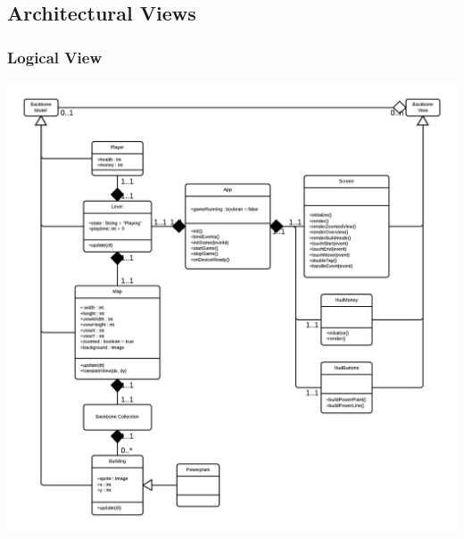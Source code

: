 \subsection{Architectural Views}

\subsubsection{Logical View} %

\includegraphics[width=\textwidth]{pictures/class_diagram}


